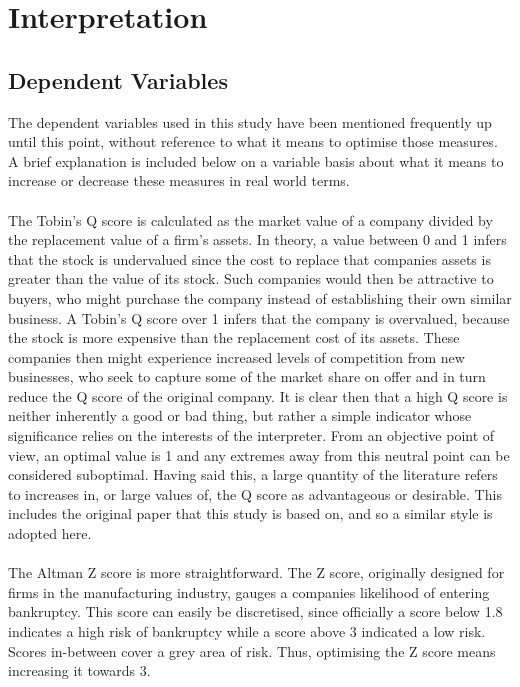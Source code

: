 {\section{Interpretation}
\subsection{Dependent Variables}
{The dependent variables used in this study have been mentioned frequently up until this point, without reference to what it means to optimise those measures. A brief explanation is included below on a variable basis about what it means to increase or decrease these measures in real world terms. \\\\
The Tobin's Q score is calculated as the market value of a company divided by the replacement value of a firm's assets. In theory, a value between 0 and 1 infers that the stock is undervalued since the cost to replace that companies assets is greater than the value of its stock. Such companies would then be attractive to buyers, who might purchase the company instead of establishing their own similar business. A Tobin's Q score over 1 infers that the company is overvalued, because the stock is more expensive than the replacement cost of its assets. These companies then might experience increased levels of competition from new businesses, who seek to capture some of the market share on offer and in turn reduce the Q score of the original company. It is clear then that a high Q score is neither inherently a good or bad thing, but rather a simple indicator whose significance relies on the interests of the interpreter. From an objective point of view, an optimal value is 1 and any extremes away from this neutral point can be considered suboptimal. Having said this, a large quantity of the literature refers to increases in, or large values of, the Q score as advantageous or desirable. This includes the original paper that this study is based on, and so a similar style is adopted here.   \\\\
The Altman Z score is more straightforward. The Z score, originally designed for firms in the manufacturing industry, gauges a companies likelihood of entering bankruptcy. This score can easily be discretised, since officially a score below 1.8 indicates a high risk of bankruptcy while a score above 3 indicated a low risk. Scores in-between cover a grey area of risk. Thus, optimising the Z score means increasing it towards 3. \\\\
}}
